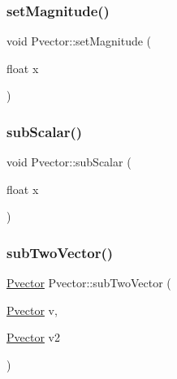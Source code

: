 \mbox{\label{class_pvector_a72261b3f2e1fc1851202f9a96abd8dc1}} 
\subsubsection{\texorpdfstring{set\+Magnitude()}{setMagnitude()}}
{\footnotesize\ttfamily void Pvector\+::set\+Magnitude (\begin{DoxyParamCaption}\item[{float}]{x }\end{DoxyParamCaption})}

\mbox{\label{class_pvector_a0b07f3f6bbdf88179a0aac0bc58b73e1}} 
\subsubsection{\texorpdfstring{sub\+Scalar()}{subScalar()}}
{\footnotesize\ttfamily void Pvector\+::sub\+Scalar (\begin{DoxyParamCaption}\item[{float}]{x }\end{DoxyParamCaption})}

\mbox{\label{class_pvector_a255e0fda569608930ed7986763f6ab85}} 
\subsubsection{\texorpdfstring{sub\+Two\+Vector()}{subTwoVector()}}
{\footnotesize\ttfamily \hyperlink{class_pvector}{Pvector} Pvector\+::sub\+Two\+Vector (\begin{DoxyParamCaption}\item[{\hyperlink{class_pvector}{Pvector}}]{v,  }\item[{\hyperlink{class_pvector}{Pvector}}]{v2 }\end{DoxyParamCaption})}

\mbox{\label{class_pvector_a11ea8cbdc8cc308d5509d5bb85142001}} 
